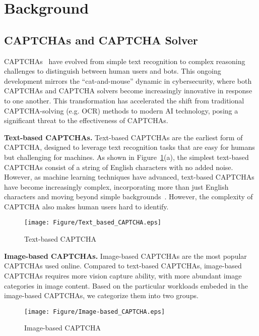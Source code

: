 \section{Background}

\subsection{CAPTCHAs and CAPTCHA Solver}

CAPTCHAs~\cite{deng2024oedipus,gao2021research} have evolved from simple text recognition to complex reasoning challenges to distinguish between human users and bots. This ongoing development mirrors the ``cat-and-mouse'' dynamic in cybersecurity, where both CAPTCHAs and CAPTCHA solvers become increasingly innovative in response to one another. This transformation has accelerated the shift from traditional CAPTCHA-solving (e.g. OCR\cite{ye2018yet}) methods to modern AI technology, posing a significant threat to the effectiveness of CAPTCHAs.



\noindent\textbf{Text-based CAPTCHAs.}
Text-based CAPTCHAs are the earliest form of CAPTCHA, designed to leverage text recognition tasks that are easy for humans but challenging for machines. As shown in Figure~\ref{fig:Text-based}(a), the simplest text-based CAPTCHAs consist of a string of English characters with no added noise. However, as machine learning techniques have advanced, text-based CAPTCHAs have become increasingly complex, incorporating more than just English characters and moving beyond simple backgrounds~\cite{searles2023empirical}. However, the complexity of CAPTCHA also makes human users hard to identify.

\begin{figure}[t!]
	\centering         \texttt{[image: Figure/Text\_based\_CAPTCHA.eps]}
	\caption{Text-based CAPTCHA}
	\label{fig:Text-based}
\end{figure}

\noindent\textbf{Image-based CAPTCHAs.} 
Image-based CAPTCHAs are the most popular CAPTCHAs used online. Compared to text-based CAPTCHAs, image-based CAPTCHAs requires more vision capture ability, with more abundant image categories in image content. Based on the particular workloads embeded in the image-based CAPTCHAs, we categorize them into two groups. 

\begin{figure}[t!]
	\centering
    \texttt{[image: Figure/Image-based\_CAPTCHA.eps]}
	\caption{Image-based CAPTCHA}
	\label{fig:Image-based}
\end{figure}

